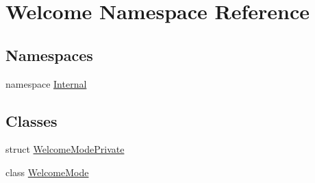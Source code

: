 \hypertarget{namespace_welcome}{\section{\-Welcome \-Namespace \-Reference}
\label{namespace_welcome}
}
\subsection*{\-Namespaces}
\begin{DoxyCompactItemize}
\item 
namespace \hyperlink{namespace_welcome_1_1_internal}{\-Internal}
\end{DoxyCompactItemize}
\subsection*{\-Classes}
\begin{DoxyCompactItemize}
\item 
struct \hyperlink{struct_welcome_1_1_welcome_mode_private}{\-Welcome\-Mode\-Private}
\item 
class \hyperlink{class_welcome_1_1_welcome_mode}{\-Welcome\-Mode}
\end{DoxyCompactItemize}
